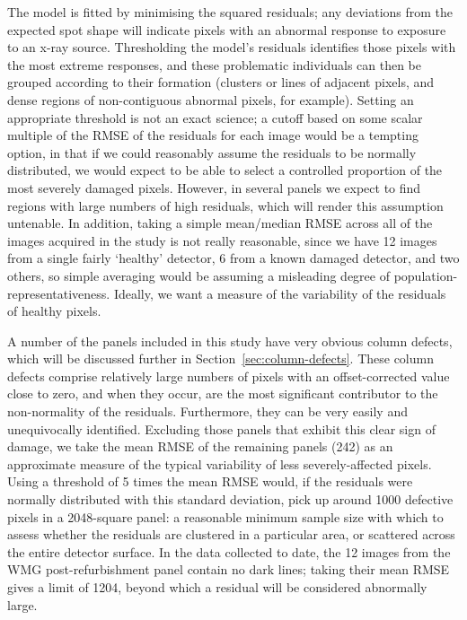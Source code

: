 \documentclass[\main/IO-Pixels.tex]{subfiles}
\begin{document}

The model is fitted by minimising the squared residuals; any deviations from the expected spot shape will indicate pixels with an abnormal response to exposure to an x-ray source. Thresholding the model's residuals identifies those pixels with the most extreme responses, and these problematic individuals can then be grouped according to their formation (clusters or lines of adjacent pixels, and dense regions of non-contiguous abnormal pixels, for example). Setting an appropriate threshold is not an exact science; a cutoff based on some scalar multiple of the RMSE of the residuals for each image would be a tempting option, in that if we could reasonably assume the residuals to be normally distributed, we would expect to be able to select a controlled proportion of the most severely damaged pixels. However, in several panels we expect to find regions with large numbers of high residuals, which will render this assumption untenable. In addition, taking a simple mean/median RMSE across all of the images acquired in the study is not really reasonable, since we have 12 images from a single fairly `healthy' detector, 6 from a known damaged detector, and two others, so simple averaging would be assuming a misleading degree of population-representativeness. Ideally, we want a measure of the variability of the residuals of healthy pixels.

A number of the panels included in this study have very obvious column defects, which will be discussed further in Section~\ref{sec:column-defects}. These column defects comprise relatively large numbers of pixels with an offset-corrected value close to zero, and when they occur, are the most significant contributor to the non-normality of the residuals. Furthermore, they can be very easily and unequivocally identified. Excluding those panels that exhibit this clear sign of damage, we take the mean RMSE of the remaining panels (242) as an approximate measure of the typical variability of less severely-affected pixels. Using a threshold of 5 times the mean RMSE would, if the residuals were normally distributed with this standard deviation, pick up around 1000 defective pixels in a 2048-square panel: a reasonable minimum sample size with which to assess whether the residuals are clustered in a particular area, or scattered across the entire detector surface. In the data collected to date, the 12 images from the WMG post-refurbishment panel contain no dark lines; taking their mean RMSE gives a limit of 1204, beyond which a residual will be considered abnormally large.
\end{document}
